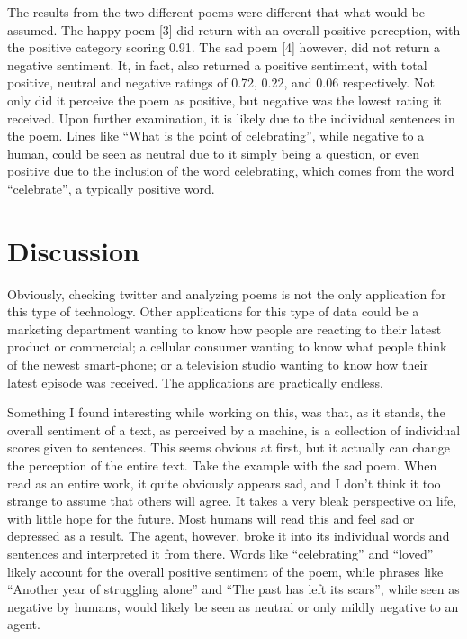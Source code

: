 \documentclass[]{article}
\begin{document}
    The results from the two different poems were different that what would be assumed. The happy poem [3] did return
    with an overall positive perception, with the positive category scoring 0.91. The sad poem [4] however, did not
    return a negative sentiment. It, in fact, also returned a positive sentiment, with total positive, neutral and 
    negative ratings of 0.72, 0.22, and 0.06 respectively. Not only did it perceive the poem as positive, but negative
    was the lowest rating it received. Upon further examination, it is likely due to the individual sentences in the
    poem. Lines like ``What is the point of celebrating'', while negative to a human, could be seen as neutral due
    to it simply being a question, or even positive due to the inclusion of the word celebrating, which comes from the 
    word ``celebrate'', a typically positive word. 

    \section{Discussion}
    Obviously, checking twitter and analyzing poems is not the only application for this type of technology. 
    Other applications for this type of data could be a marketing department wanting to know how people are reacting
    to their latest product or commercial; a cellular consumer wanting to know what people think of the newest 
    smart-phone; or a television studio wanting to know how their latest episode was received. The applications
    are practically endless.

    Something I found interesting while working on this, was that, as it stands, the overall sentiment of a text,
    as perceived by a machine, is a collection of individual scores given to sentences. This seems obvious at first,
    but it actually can change the perception of the entire text. Take the example with the sad poem. When read as 
    an entire work, it quite obviously appears sad, and I don't think it too strange to assume that others will agree.
    It takes a very bleak perspective on life, with little hope for the future. Most humans will read this and 
    feel sad or depressed as a result. The agent, however, broke it into its individual words and sentences and 
    interpreted it from there. Words like ``celebrating'' and  ``loved'' likely account for the overall positive 
    sentiment of the poem, while phrases like ``Another year of struggling alone'' and ``The past has left its scars'',
    while seen as negative by humans, would likely be seen as neutral or only mildly negative to an agent.
\end{document}
